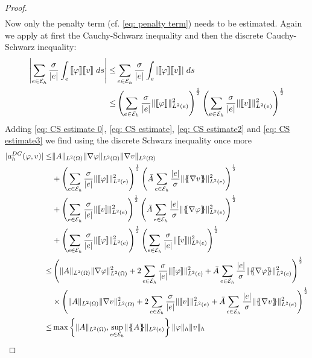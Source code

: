 \begin{proof}
\begin{align}
	\end{align}
	Now only the penalty term (cf. \eqref{eq: penalty term}) needs to be estimated. Again we apply at first the Cauchy-Schwarz inequality and then the discrete Cauchy-Schwarz inequality:
	\begin{align}
	\left| \sum_{e \in \mathcal{E}_h} \frac \sigma {|e|} \int_{e} {{\llbracket \varphi \rrbracket \llbracket v \rrbracket }\;ds} \right|
	\leq& \sum_{e \in \mathcal{E}_h} \frac \sigma  {|e|} \int_{e} {{ \left| \llbracket \varphi \rrbracket \llbracket v \rrbracket  \right|}\;ds} \nonumber \\
	\leq& \left( \sum\limits_{e \in \mathcal{E}_h} \frac \sigma{|e|} \lVert \llbracket \varphi \rrbracket \rVert_{L^2(e)}^2 \right)^{\frac 1 2} \left( \sum\limits_{e \in \mathcal{E}_h} \frac \sigma {|e|} \lVert \llbracket v \rrbracket \rVert_{L^2(e)}^2 \right)^{\frac 1 2} \label{eq: CS estimate3}
	\end{align}
	Adding \eqref{eq: CS estimate 0}, \eqref{eq: CS estimate}, \eqref{eq: CS estimate2} and \eqref{eq: CS estimate3} we find using the discrete Schwarz inequality once more
	\begin{align}
	|a_h^{DG}(\varphi,v)| \leq& 
	 \LTwonorm{A} \LTwonorm {\nabla \varphi} \LTwonorm{\nabla v} \nonumber\\
	& +\left( \sum\limits_{e \in \edges}\frac {\sigma}{|e|}\LTwonormE{\jump {\varphi}}^2 \right)^{\frac 1 2}
	\left( \bar A \sum\limits_{e \in \edges} \frac {|e|} \sigma \LTwonormE{\average{\nabla v}}^2 \right)^{\frac 1 2} \nonumber\\
	& +	\left( \sum\limits_{e \in \edges} \frac {\sigma} {|e|}\LTwonormE{\jump {v}}^2 \right)^{\frac 1 2}
	\left( \bar A \sum\limits_{e \in \edges} \frac {|e|} \sigma \LTwonormE{\average{\nabla \varphi}}^2 \right)^{\frac 1 2}\nonumber \\
	& + \left( \sum\limits_{e \in \edges} \frac \sigma{|e|} \LTwonormE{\jump{\varphi}}^2 \right)^{\frac 1 2} \left( \sum\limits_{e \in \edges} \frac \sigma {|e|} \LTwonormE{\jump{v}}^2 \right)^{\frac 1 2} \nonumber \\
	\leq& 
	\left( 
	\LTwonorm{A}\LTwonorm{\nabla \varphi}^2+2\sum\limits_{e \in \edges} \frac {\sigma} {|e|}\LTwonormE{\jump {\varphi}}^2+ \bar A\sum\limits_{e \in \edges} \frac {|e|} \sigma \LTwonormE{\average{\nabla \varphi}}^2
	\right)^{\frac 1 2} \nonumber \\
	&\times
	\left( 
	\LTwonorm{A} \LTwonorm{\nabla v}^2+2\sum\limits_{e \in \edges} \frac {\sigma}{|e|}\LTwonormE{\jump {v}}^2+ \bar A\sum\limits_{e \in \edges} \frac {|e|} \sigma \LTwonormE{\average{\nabla v}}^2
	\right) ^{\frac 1 2} \nonumber \\
	\leq & \max {\LTwonorm{A}} {\sup_{e \in \edges }\LTwonormE{\average A}} \eNorm \varphi \eNorm v   \label{eq: exact estimate boundedness} %
	\end{align}
	\phantom{blub}
\end{proof}

